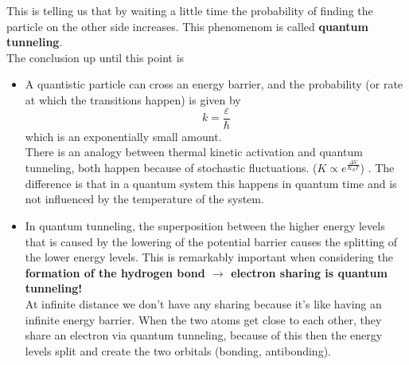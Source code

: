 This is telling us that by waiting a little time the probability of finding the particle on the other side increases. This phenomenom is called \textbf{quantum tunneling}.\\
The conclusion up until this point is 
\begin{itemize}
	\item A quantistic particle can cross an energy barrier, and the probability (or 		rate at which the transitions happen) is given by 
	\[
	k=\frac{\varepsilon}{\hbar}
	\]
	which is an exponentially small amount.\\
	There is an analogy between thermal kinetic activation and quantum tunneling, both 	happen because of stochastic fluctuations. ($K\propto e^{\frac{\Delta V}{K_B T}}$)		. The difference is that in a quantum system this happens in quantum time and is 		not influenced by the temperature of the system.\\
	\item In quantum tunneling, the superposition between the higher energy levels 			that is caused by the lowering of the potential barrier causes the splitting of 		the lower energy levels. This is remarkably important when considering the 				\textbf{formation of the hydrogen bond $\rightarrow$ electron sharing is quantum 		tunneling!}\\
	At infinite distance we don't have any sharing because it's like having an 				infinite energy barrier. When the two atoms get close to each other, they share an 	electron via quantum tunneling, because of this then the energy levels split and 		create the two orbitals (bonding, antibonding).\\
\end{itemize}

